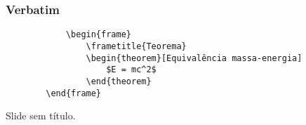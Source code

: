 
\begin{frame}[fragile] %
	\frametitle{Verbatim}
	
	\begin{example}
		\begin{verbatim}
			\begin{frame}
				\frametitle{Teorema}
				\begin{theorem}[Equivalência massa-energia]
					$E = mc^2$
				\end{theorem}
		\end{frame}\end{verbatim} %
	\end{example}
\end{frame}


\begin{frame}
	Slide sem título.
\end{frame}